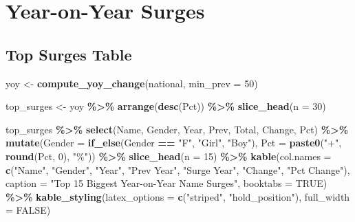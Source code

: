 \documentclass[
]{article}
\newenvironment{Shaded}{\begin{snugshade}}{\end{snugshade}}
\newcommand{\AttributeTok}[1]{\textcolor[rgb]{0.13,0.29,0.53}{#1}}
\newcommand{\ConstantTok}[1]{\textcolor[rgb]{0.56,0.35,0.01}{#1}}
\newcommand{\DecValTok}[1]{\textcolor[rgb]{0.00,0.00,0.81}{#1}}
\newcommand{\FunctionTok}[1]{\textcolor[rgb]{0.13,0.29,0.53}{\textbf{#1}}}
\newcommand{\NormalTok}[1]{#1}
\newcommand{\OtherTok}[1]{\textcolor[rgb]{0.56,0.35,0.01}{#1}}
\newcommand{\SpecialCharTok}[1]{\textcolor[rgb]{0.81,0.36,0.00}{\textbf{#1}}}
\newcommand{\StringTok}[1]{\textcolor[rgb]{0.31,0.60,0.02}{#1}}
\begin{document}
\newpage

\section{Year-on-Year Surges}\label{year-on-year-surges}

\subsection{Top Surges Table}\label{top-surges-table}

\begin{Shaded}
\begin{Highlighting}[]
\NormalTok{yoy }\OtherTok{\textless{}{-}} \FunctionTok{compute\_yoy\_change}\NormalTok{(national, }\AttributeTok{min\_prev =} \DecValTok{50}\NormalTok{)}

\NormalTok{top\_surges }\OtherTok{\textless{}{-}}\NormalTok{ yoy }\SpecialCharTok{\%\textgreater{}\%} \FunctionTok{arrange}\NormalTok{(}\FunctionTok{desc}\NormalTok{(Pct)) }\SpecialCharTok{\%\textgreater{}\%} \FunctionTok{slice\_head}\NormalTok{(}\AttributeTok{n =} \DecValTok{30}\NormalTok{)}
\end{Highlighting}
\end{Shaded}

\begin{Shaded}
\begin{Highlighting}[]
\NormalTok{top\_surges }\SpecialCharTok{\%\textgreater{}\%}
    \FunctionTok{select}\NormalTok{(Name, Gender, Year, Prev, Total, Change, Pct) }\SpecialCharTok{\%\textgreater{}\%}
    \FunctionTok{mutate}\NormalTok{(}\AttributeTok{Gender =} \FunctionTok{if\_else}\NormalTok{(Gender }\SpecialCharTok{==} \StringTok{"F"}\NormalTok{, }\StringTok{"Girl"}\NormalTok{, }\StringTok{"Boy"}\NormalTok{),}
           \AttributeTok{Pct =} \FunctionTok{paste0}\NormalTok{(}\StringTok{"+"}\NormalTok{, }\FunctionTok{round}\NormalTok{(Pct, }\DecValTok{0}\NormalTok{), }\StringTok{"\%"}\NormalTok{)) }\SpecialCharTok{\%\textgreater{}\%}
    \FunctionTok{slice\_head}\NormalTok{(}\AttributeTok{n =} \DecValTok{15}\NormalTok{) }\SpecialCharTok{\%\textgreater{}\%}
    \FunctionTok{kable}\NormalTok{(}\AttributeTok{col.names =} \FunctionTok{c}\NormalTok{(}\StringTok{"Name"}\NormalTok{, }\StringTok{"Gender"}\NormalTok{, }\StringTok{"Year"}\NormalTok{, }\StringTok{"Prev Year"}\NormalTok{, }\StringTok{"Surge Year"}\NormalTok{,}
                         \StringTok{"Change"}\NormalTok{, }\StringTok{"Pct Change"}\NormalTok{),}
          \AttributeTok{caption =} \StringTok{"Top 15 Biggest Year{-}on{-}Year Name Surges"}\NormalTok{,}
          \AttributeTok{booktabs =} \ConstantTok{TRUE}\NormalTok{) }\SpecialCharTok{\%\textgreater{}\%}
    \FunctionTok{kable\_styling}\NormalTok{(}\AttributeTok{latex\_options =} \FunctionTok{c}\NormalTok{(}\StringTok{"striped"}\NormalTok{, }\StringTok{"hold\_position"}\NormalTok{), }\AttributeTok{full\_width =} \ConstantTok{FALSE}\NormalTok{)}
\end{Highlighting}
\end{Shaded}
\end{document}
